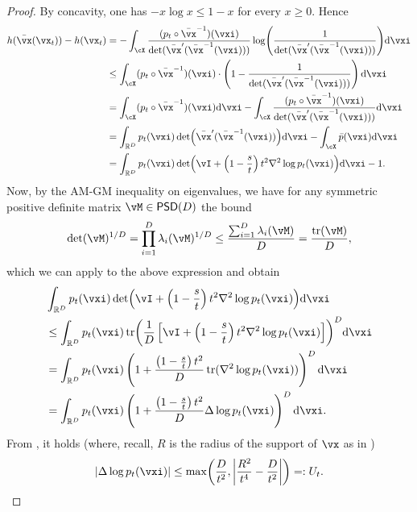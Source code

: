 \documentclass[../../book-main.tex]{subfiles}
\begin{document}
\begin{proof}
    By concavity, one has \(-x\log x \leq 1 - x\) for every \(x \geq 0\). Hence 
    \begin{align}
        h(\bar{\vx}(\vx_{t})) - h(\vx_{t})
        &= - \int_{\cX}\frac{(p_{t} \circ \bar{\vx}^{-1})(\vxi)}{\det(\bar{\vx}^{\prime}(\bar{\vx}^{-1}(\vxi)))}\log\rp{\frac{1}{\det(\bar{\vx}^{\prime}(\bar{\vx}^{-1}(\vxi)))}}\odif{\vxi} \\ 
        &\leq  \int_{\cX}(p_{t} \circ \bar{\vx}^{-1})(\vxi)\cdot \bp{1 - \frac{1}{\det(\bar{\vx}^{\prime}(\bar{\vx}^{-1}(\vxi)))}}\odif{\vxi} \\ 
        &= \int_{\cX}(p_{t} \circ \bar{\vx}^{-1})(\vxi)\odif{\vxi} - \int_{\cX}\frac{(p_{t} \circ \bar{\vx}^{-1})(\vxi)}{\det(\bar{\vx}^{\prime}(\bar{\vx}^{-1}(\vxi)))}\odif{\vxi} \\
        &= \int_{\R^{D}}p_{t}(\vxi)\det\rp{\bar{\vx}^{\prime}(\bar{\vx}^{-1}(\vxi))}\odif{\vxi} - \int_{\cX}\bar{p}(\vxi)\odif{\vxi} \\
        &= \int_{\R^{D}}p_{t}(\vxi)\det\rp{\vI + \bp{1 - \frac{s}{t}}t^{2}\nabla^{2}\log p_{t}(\vxi)}\odif{\vxi} - 1.
    \end{align}
    Now, by the AM-GM inequality on eigenvalues, we have for any symmetric positive definite matrix \(\vM \in \PSD(D)\) the bound 
    \begin{equation}
        \det(\vM)^{1/D} = \prod_{i = 1}^{D}\lambda_{i}(\vM)^{1/D} \leq \frac{\sum_{i = 1}^{D}\lambda_{i}(\vM)}{D} = \frac{\tr(\vM)}{D},
    \end{equation}
    which we can apply to the above expression and obtain 
    \begin{align}
        &\int_{\R^{D}}p_{t}(\vxi)\det\rp{\vI + \bp{1 - \frac{s}{t}}t^{2}\nabla^{2}\log p_{t}(\vxi)}\odif{\vxi} \\
        &\leq \int_{\R^{D}} p_{t}(\vxi) \tr\rp{\frac{1}{D}\bs{\vI + \bp{1 - \frac{s}{t}}t^{2}\nabla^{2}\log p_{t}(\vxi)}}^{D}\odif{\vxi} \\
        &= \int_{\R^{D}} p_{t}(\vxi)\bp{1 + \frac{\bp{1 - \frac{s}{t}}t^{2}}{D}\tr(\nabla^{2}\log p_{t}(\vxi))}^{D}\odif{\vxi} \\
        &= \int_{\R^{D}} p_{t}(\vxi)\bp{1 + \frac{\bp{1 - \frac{s}{t}}t^{2}}{D}\Delta \log p_{t}(\vxi)}^{D}\odif{\vxi}.
    \end{align}
    From , it holds (where, recall, \(R\) is the radius of the support of \(\vx\) as in )
    \begin{equation}
        \abs{\Delta \log p_{t}(\vxi)} \leq \max\rp{\frac{D}{t^{2}}, \abs*{\frac{R^{2}}{t^{4}} - \frac{D}{t^{2}}}} =: U_{t}.

\end{equation}
\end{proof}
\end{document}
